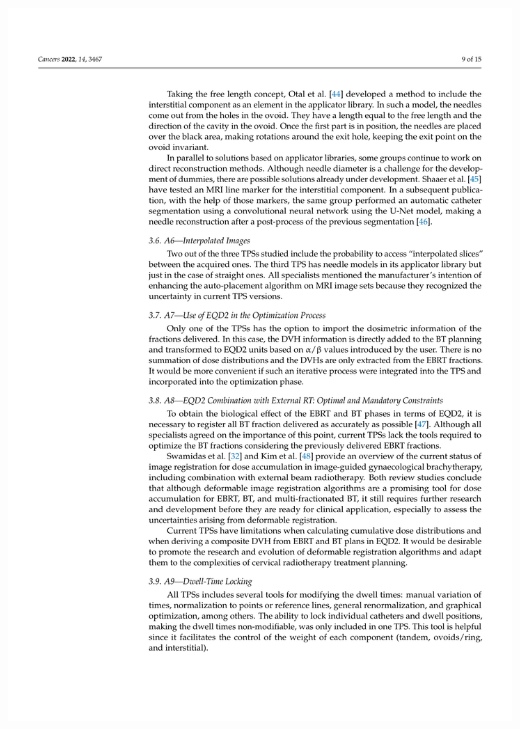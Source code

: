 \documentclass[
  a4paper,
]{scrreprt}
\begin{document}
\includegraphics{articulos/cancers/cancers-09.png}
\end{document}
